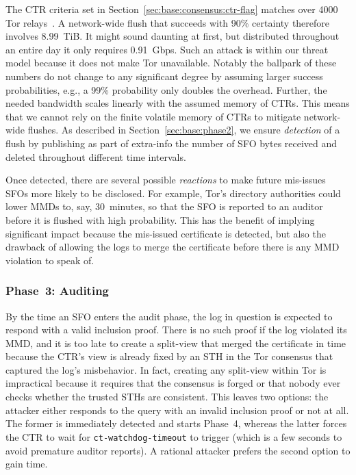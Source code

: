 The CTR criteria set in Section~\ref{sec:base:consensus:ctr-flag} matches over
4000 Tor relays~\cite{relay-by-flag}.  A network-wide flush that succeeds with
90\% certainty therefore involves 8.99~TiB.  It might sound daunting at first,
but distributed throughout an entire day it only requires 0.91~Gbps. Such an
attack is within our threat model because it does not make Tor unavailable.
Notably the ballpark of these numbers do not change to any significant degree by
assuming larger success probabilities, e.g., a 99\% probability only doubles the
overhead. Further, the needed bandwidth scales linearly with the assumed memory
of CTRs.  This means that we cannot rely on the finite volatile memory of CTRs
to mitigate network-wide flushes.  As described in
Section~\ref{sec:base:phase2}, we ensure \emph{detection} of a flush by
publishing as part of extra-info the number of SFO bytes received and deleted
throughout different time intervals.

Once detected, there are several possible \emph{reactions} to make future
mis-issues SFOs more likely to be disclosed.  For example, Tor's directory
authorities could lower MMDs to, say, 30~minutes, so that the SFO is reported to
an auditor before it is flushed with high probability.  This has the benefit of
implying significant impact because the mis-issued certificate is detected, but
also the drawback of allowing the logs to merge the certificate before there is
any MMD violation to speak of. 


\subsubsection{Phase~3: Auditing} \label{sec:analysis:pr:phase3}
By the time an SFO enters the audit phase, the log in question is expected to
respond with a valid inclusion proof.  There is no such proof if the log
violated its MMD, and it is too late to create a split-view that merged the
certificate in time because the CTR's view is already fixed by an STH in the
Tor consensus that captured the log's misbehavior.  In fact, creating any
split-view within Tor is impractical because it requires that the consensus is
forged or that nobody ever checks whether the trusted STHs are consistent.
This leaves two options:
	the attacker either responds to the query with an invalid inclusion proof or
	not at all.
The former is immediately detected and starts Phase~4, whereas the latter forces
the CTR to wait for \texttt{ct-watchdog-timeout} to trigger (which is a
few seconds to avoid premature auditor reports).  A rational attacker prefers
the second option to gain time.

